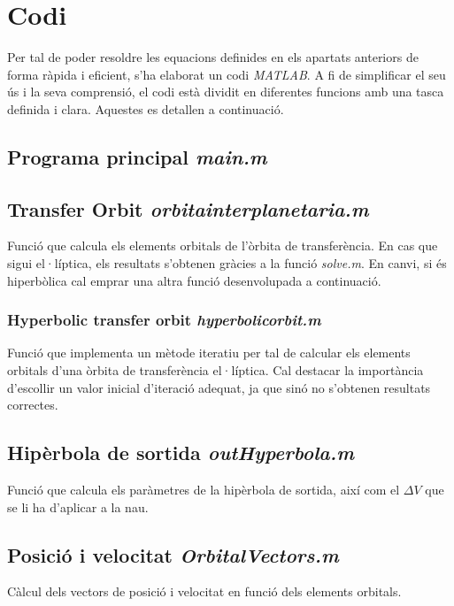 \chapter{Codi}
\label{code}
Per tal de poder resoldre les equacions definides en els apartats anteriors de forma ràpida i eficient, s'ha elaborat un codi \textit{MATLAB}. A fi de simplificar el seu ús i la seva comprensió, el codi està dividit en diferentes funcions amb una tasca definida i clara. Aquestes es detallen a continuació.
\section[Programa principal]{Programa principal \textit{main.m}}

\section[Transfer Orbit]{Transfer Orbit \textit{orbitainterplanetaria.m}}
Funció que calcula els elements orbitals de l'òrbita de transferència. En cas que sigui el·líptica, els resultats s'obtenen gràcies a la funció \textit{solve.m}. En canvi, si és hiperbòlica cal emprar una altra funció desenvolupada a continuació.

\subsection[Hyperbolic transfer orbit]{Hyperbolic transfer orbit \textit{hyperbolicorbit.m}}
Funció que implementa un mètode iteratiu per tal de calcular els elements orbitals d'una òrbita de transferència el·líptica. Cal destacar la importància d'escollir un valor inicial d'iteració adequat, ja que sinó no s'obtenen resultats correctes.

\section[Hipèrbola de sortida]{Hipèrbola de sortida \textit{outHyperbola.m}}
\label{outHyperbola}
Funció que calcula els paràmetres de la hipèrbola de sortida, així com el $\Delta V$ que se li ha d'aplicar a la nau.

\section[Posició i velocitat]{Posició i velocitat \textit{OrbitalVectors.m}}
\label{OrbitalVectors}
Càlcul dels vectors de posició i velocitat en funció dels elements orbitals.

